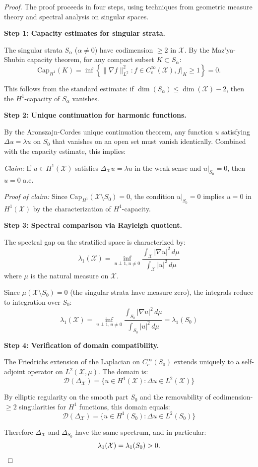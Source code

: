 \begin{proof}
The proof proceeds in four steps, using techniques from geometric measure 
theory and spectral analysis on singular spaces.

\textbf{Step 1: Capacity estimates for singular strata.}

The singular strata $S_\alpha$ ($\alpha \neq 0$) have codimension $\geq 2$ 
in $\mathcal{X}$. By the Maz'ya-Shubin capacity theorem, for any compact 
subset $K \subset S_\alpha$:
\[
\mathrm{Cap}_{H^1}(K) = \inf\left\{\|\nabla f\|_{L^2}^2 : f \in C_c^\infty(\mathcal{X}), f|_K \geq 1\right\} = 0.
\]

This follows from the standard estimate: if $\dim(S_\alpha) \leq \dim(\mathcal{X}) - 2$, 
then the $H^1$-capacity of $S_\alpha$ vanishes.

\textbf{Step 2: Unique continuation for harmonic functions.}

By the Aronszajn-Cordes unique continuation theorem, any function $u$ satisfying 
$\Delta u = \lambda u$ on $S_0$ that vanishes on an open set must vanish identically. 
Combined with the capacity estimate, this implies:

\textit{Claim:} If $u \in H^1(\mathcal{X})$ satisfies $\Delta_{\mathcal{X}} u = \lambda u$ 
in the weak sense and $u|_{S_0} = 0$, then $u = 0$ a.e.

\textit{Proof of claim:} Since $\mathrm{Cap}_{H^1}(\mathcal{X} \setminus S_0) = 0$, 
the condition $u|_{S_0} = 0$ implies $u = 0$ in $H^1(\mathcal{X})$ by the 
characterization of $H^1$-capacity.

\textbf{Step 3: Spectral comparison via Rayleigh quotient.}

The spectral gap on the stratified space is characterized by:
\[
\lambda_1(\mathcal{X}) = \inf_{u \perp 1, u \neq 0} \frac{\int_{\mathcal{X}} |\nabla u|^2 \, d\mu}{\int_{\mathcal{X}} |u|^2 \, d\mu}
\]
where $\mu$ is the natural measure on $\mathcal{X}$.

Since $\mu(\mathcal{X} \setminus S_0) = 0$ (the singular strata have measure zero), 
the integrals reduce to integration over $S_0$:
\[
\lambda_1(\mathcal{X}) = \inf_{u \perp 1, u \neq 0} \frac{\int_{S_0} |\nabla u|^2 \, d\mu}{\int_{S_0} |u|^2 \, d\mu} = \lambda_1(S_0)
\]

\textbf{Step 4: Verification of domain compatibility.}

The Friedrichs extension of the Laplacian on $C_c^\infty(S_0)$ extends uniquely 
to a self-adjoint operator on $L^2(\mathcal{X}, \mu)$. The domain is:
\[
\mathcal{D}(\Delta_{\mathcal{X}}) = \{u \in H^1(\mathcal{X}) : \Delta u \in L^2(\mathcal{X})\}
\]

By elliptic regularity on the smooth part $S_0$ and the removability of 
codimension-$\geq 2$ singularities for $H^1$ functions, this domain equals:
\[
\mathcal{D}(\Delta_{\mathcal{X}}) = \{u \in H^1(S_0) : \Delta u \in L^2(S_0)\}
\]

Therefore $\Delta_{\mathcal{X}}$ and $\Delta_{S_0}$ have the same spectrum, 
and in particular:
\[
\lambda_1(\mathcal{X}) = \lambda_1(S_0) > 0. \qedhere
\]
\end{proof}

